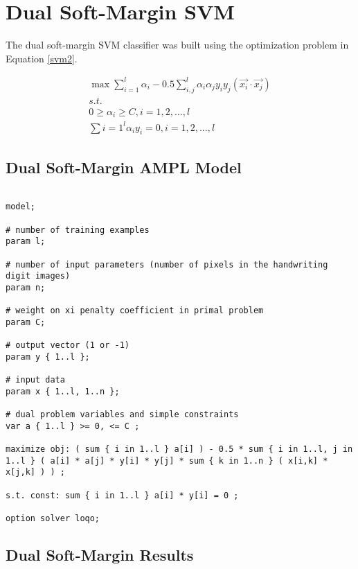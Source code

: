 \documentclass{article}
\begin{document}
\section{Dual Soft-Margin SVM}\label{model2}

The dual soft-margin SVM classifier was built using the optimization problem in Equation \ref{svm2}.

\begin{equation}\label{svm2}
\begin{split}
\max \sum_{i=1}^l \alpha_i - 0.5 \sum_{i,j}^l \alpha_i \alpha_j y_i y_j \left( \vec{x_i} \cdot \vec{x_j} \right) \\
s.t. \\
0 \ge \alpha_i \ge C , i = 1,2,...,l \\
\sum{i=1}^l \alpha_i y_i = 0 , i = 1,2,...,l
\end{split}
\end{equation}

\subsection{Dual Soft-Margin AMPL Model}

\begin{verbatim}

model;

# number of training examples
param l;

# number of input parameters (number of pixels in the handwriting digit images)
param n;

# weight on xi penalty coefficient in primal problem
param C;

# output vector (1 or -1)
param y { 1..l };

# input data
param x { 1..l, 1..n };

# dual problem variables and simple constraints
var a { 1..l } >= 0, <= C ;

maximize obj: ( sum { i in 1..l } a[i] ) - 0.5 * sum { i in 1..l, j in 1..l } ( a[i] * a[j] * y[i] * y[j] * sum { k in 1..n } ( x[i,k] * x[j,k] ) ) ;

s.t. const: sum { i in 1..l } a[i] * y[i] = 0 ;

option solver loqo;

\end{verbatim}

\subsection{Dual Soft-Margin Results}
\end{document}
